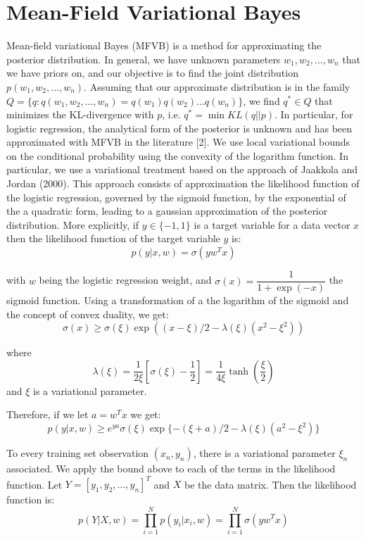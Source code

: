 
\section{Mean-Field Variational Bayes}\label{sec:mfvb}

Mean-field variational Bayes (MFVB) is a method for approximating the posterior distribution.  In general, we have unknown parameters $w_1, w_2, \ldots, w_n$ that we have priors on, and our objective is to find the joint distribution $p(w_1, w_2, \ldots, w_n)$.  Assuming that our approximate distribution is in the family $Q = \{q : q(w_1, w_2, \ldots, w_n) = q(w_1)q(w_2) \ldots q(w_n)\}$, we find $q^* \in Q$ that minimizes the KL-divergence with $p$, i.e. $q^* = \min KL(q || p)$. 
In particular, for logistic regression, the analytical form of the posterior is unknown and has been approximated with MFVB in the literature [2]. We use local variational bounds on the conditional probability using the convexity of the logarithm function. In particular, we use a variational treatment based on the approach of Jaakkola and Jordan (2000). 
This approach consists of approximation the likelihood function of the logistic regression, governed by the sigmoid function, by the exponential of the a quadratic form, leading to a gaussian approximation of the posterior distribution. More explicitly, if $y\in \{-1,1\}$ is a target variable for a data vector $x$ then the likelihood function of the target variable $y$ is: 
\begin{equation}
p(y | x, w)=\sigma(y w^T x)
\end{equation}

with $w$ being the logistic regression weight, and $\sigma(x)=\dfrac{1}{1+\exp(-x)}$ the sigmoid function. 
Using a transformation of a the logarithm of the sigmoid and the concept of convex duality, we get: 
\begin{equation}
\sigma(x) \geq \sigma(\xi)\exp((x-\xi)/2-\lambda(\xi)(x^2-\xi^2))
\end{equation}

where
$$\lambda(\xi)=\frac{1}{2\xi}[\sigma(\xi)-\frac{1}{2}]=\frac{1}{4\xi}\tanh(\frac{\xi}{2})$$
and $\xi$ is a variational parameter. 

Therefore, if we let $a=w^T x$ we get: 
\begin{equation}
p( y | x,w)\geq e^{ya} \sigma(\xi)\exp\{-(\xi+a)/2-\lambda(\xi)(a^2-\xi^2)\}
\end{equation}

To every training set observation $(x_n, y_n)$, there is a variational parameter $\xi_n$ associated. We apply the bound above to each of the terms in the likelihood function. Let $Y=[y_1, y_2, \ldots , y_n]^T$ and $X$ be the data matrix. Then the likelihood function is: 
\begin{equation}
p( Y | X, w)=\prod_{i=1}^{N} p(y_i | x_i, w) = \prod_{i=1}^{N} \sigma(y w^T x)
\end{equation}

